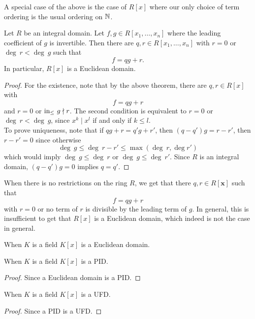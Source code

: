 A special case of the above is the case of $R[x]$ where our only choice of term ordering is the usual ordering on $\mathbb{N}$. 
\begin{corollary}
    Let $R$ be an integral domain. Let $f,g\in R[x_1,\dots,x_n]$ where the leading coefficient of $g$ is invertible. Then there are $q,r\in R[x_1,\dots,x_n]$ with $r=0$ or $\deg \ r < \deg \ g$ such that 
    $$f=qg+r.$$
    In particular, $R[x]$ is a Euclidean domain.
\end{corollary}
\begin{proof}
    For the existence, note that by the above theorem, there are $q,r\in R[x]$ with 
    $$f=qg+r$$
    and $r=0$ or $\mathrm{in}_\leq\ g\nmid r$. The second condition is equivalent to $r=0$ or $\deg \ r < \deg \ g$, since $x^k\mid x^l$ if and only if $k\leq l$.\\
    To prove uniqueness, note that if $qg+r=q'g+r'$, then $(q-q')g=r-r'$, then $r-r'=0$ since otherwise 
    $$
        \deg\ g \leq \deg\ r - r' \leq \max(\deg\ r,\deg r') 
    $$
    which would imply $\deg \ g \leq \deg \ r$ or $\deg \ g \leq \deg \ r'$. Since $R$ is an integral domain, $(q-q')g=0$ implies $q=q'$. 
\end{proof}
\begin{remark}
    When there is no restrictions on the ring $R$, we get that there $q,r\in R[\mathbf{x}]$ such that 
    $$
        f = qg+r
    $$
    with $r=0$ or no term of $r$ is divisible by the leading term of $g$. In general, this is insufficient to get that $R[x]$ is a Euclidean domain, which indeed is not the case in general.  
\end{remark}
\begin{corollary}\label{PolynomialRingOverFieldIsEuclideanDomain}
    When $K$ is a field $K[x]$ is a Euclidean domain.
\end{corollary}
\begin{corollary}\label{PolynomialRingOverFieldIsPID}
    When $K$ is a field $K[x]$ is a PID.
\end{corollary}
\begin{proof}
    Since a Euclidean domain is a PID.
\end{proof}
\begin{corollary}\label{PolyonmialRingOverFieldIsUFD}
    When $K$ is a field $K[x]$ is a UFD.
\end{corollary}
\begin{proof}
    Since a PID is a UFD. 
\end{proof}
